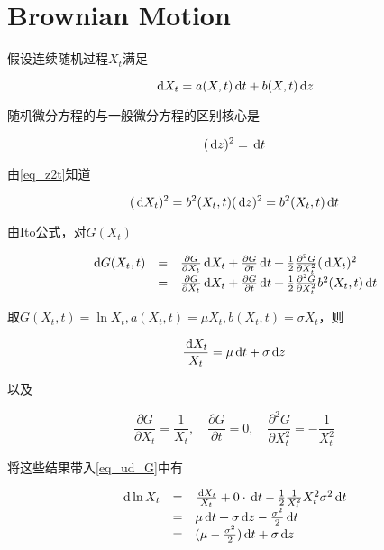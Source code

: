 \section{Brownian Motion}

假设连续随机过程$X_t$满足

\begin{equation}
    \,\mathrm{d} X_t = a(X,t)\,\mathrm{d} t + b(X,t)\,\mathrm{d} z
\end{equation}

随机微分方程的与一般微分方程的区别核心是

\begin{equation}\label{eq_z2t}
    (\,\mathrm{d} z)^2 = \,\mathrm{d} t
\end{equation}

由\ref{eq_z2t}知道

\begin{equation}
    (\,\mathrm{d} X_t)^2 = b^2(X_t,t) (\,\mathrm{d} z)^2 = b^2(X_t,t) \,\mathrm{d} t
\end{equation}

由Ito公式，对$G(X_t)$

\begin{equation}\label{eq_ud_G}
    \begin{array}{rcl}
        \,\mathrm{d} G(X_t,t) & = & \frac{\partial G}{\partial X_t}\,\mathrm{d} X_t + \frac{\partial G}{\partial t}\,\mathrm{d} t + \frac{1}{2}\frac{\partial^2 G}{\partial X_t^2} (\,\mathrm{d} X_t)^2      \\
                     & = & \frac{\partial G}{\partial X_t}\,\mathrm{d} X_t + \frac{\partial G}{\partial t}\,\mathrm{d} t + \frac{1}{2}\frac{\partial^2 G}{\partial X_t^2} b^2(X_t,t) \,\mathrm{d} t
    \end{array}
\end{equation}

取$G(X_t,t) = \ln X_t, a(X_t,t) = \mu X_t, b(X_t,t) = \sigma X_t$，则

\begin{equation}
    \frac{\,\mathrm{d} X_t}{X_t} = \mu \,\mathrm{d} t + \sigma \,\mathrm{d} z
\end{equation}

以及

\begin{equation}
    \frac{\partial G}{\partial X_t} = \frac{1}{X_t},\quad \frac{\partial G}{\partial t} = 0, \quad \frac{\partial^2 G}{\partial X_t^2} = -\frac{1}{X_t^2}
\end{equation}

将这些结果带入\ref{eq_ud_G}中有

\begin{equation}
    \begin{array}{rcl}
        \,\mathrm{d} \ln X_t & = & \frac{\,\mathrm{d} X_t}{X_t} + 0\cdot\,\mathrm{d} t -\frac{1}{2}\frac{1}{X_t^2}X_t^2\sigma^2\,\mathrm{d} t \\
                    & = & \mu\,\mathrm{d} t + \sigma \,\mathrm{d} z - \frac{\sigma^2}{2}\,\mathrm{d} t                               \\
                    & = & (\mu - \frac{\sigma^2}{2})\,\mathrm{d} t + \sigma \,\mathrm{d} z
    \end{array}
\end{equation}

